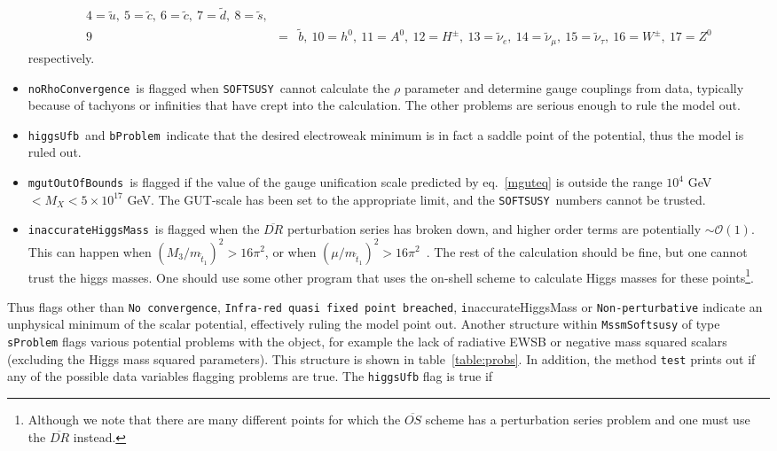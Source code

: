 \documentclass[]{article}
\def\SOFTSUSY{{\tt SOFTSUSY}}
\def\code#1{\small{\tt #1}\normalsize}
\begin{document}
\begin{itemize}
\begin{eqnarray}
4=\tilde u,\ 5=\tilde c,\ 6=\tilde c,\ 7=\tilde d,\ 
8=\tilde s, \nonumber \\
9&=&{\tilde b},\ 10=h^0,\ 11=A^0,\ 12=H^\pm,\ 13={\tilde \nu}_e,\
14={\tilde \nu}_\mu,\ 15={\tilde \nu}_\tau,\ 16=W^\pm,\ 17=Z^0\nonumber
\end{eqnarray}
respectively.
\item
\code{noRhoConvergence}~is flagged when \SOFTSUSY~cannot calculate the $\rho$
parameter and determine gauge couplings from data, typically because of
tachyons or infinities that have crept into the calculation. The other
problems are serious enough to rule the model out.
\item
\code{higgsUfb}~and \code{bProblem}~indicate that the desired electroweak minimum is in fact a
saddle point of the potential, thus the model is ruled out.
\item
\code{mgutOutOfBounds}~is flagged if the value of the gauge unification scale
predicted by eq.~\ref{mguteq}
is outside the range $10^4$ GeV $< M_X < 5 \times 10^{17}$ GeV. The GUT-scale
has been set to the appropriate limit, and the \SOFTSUSY~numbers cannot be
trusted. 
\item
\code{inaccurateHiggsMass}~is flagged when the $\overline{DR}$ perturbation
series has broken down, and higher order terms are potentially $\sim
\mathcal{O}(1)$. This can happen when $(M_3/m_{{\tilde t}_1})^2>16 \pi^2$, or
when 
$(\mu/m_{{\tilde t}_1})^2>16 \pi^2$~\cite{Degrassi:2001yf}. The rest of the calculation should be fine,
but one cannot trust the higgs masses. One should use some other program that
uses the on-shell scheme to calculate Higgs masses for these
points\footnote{Although we note that there are many different points for
  which the 
$\overline{OS}$ scheme has a perturbation series problem and one must use
the  $\overline{DR}$ instead.}.
\end{itemize}
Thus flags other than \code{No convergence}, \code{Infra-red quasi fixed point
  breached}, {\code inaccurateHiggsMass} or
\code{Non-perturbative} indicate an
unphysical minimum of the scalar potential, effectively ruling the model point 
out.
Another structure within \code{MssmSoftsusy} of type \code{sProblem} flags
various potential problems 
with the object, for example the lack of radiative EWSB
or negative mass squared scalars (excluding the Higgs mass squared
parameters). 
This structure is shown in table~\ref{table:probs}. In addition, the method
\code{test} 
prints out if any of the possible data variables flagging problems are true.
The \code{higgsUfb} flag is true if
\end{document}
